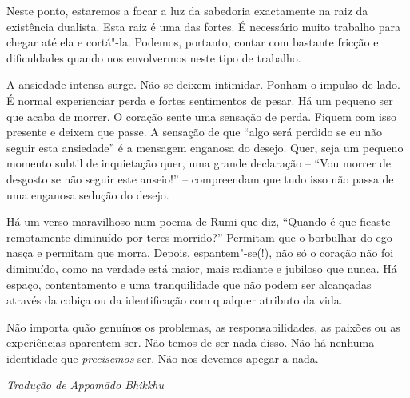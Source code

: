 Neste ponto, estaremos a focar a luz da sabedoria exactamente na raiz da
existência dualista. Esta raiz é uma das fortes. É necessário muito
trabalho para chegar até ela e cortá"-la. Podemos, portanto, contar com
bastante fricção e dificuldades quando nos envolvermos neste tipo de
trabalho.

A ansiedade intensa surge. Não se deixem intimidar. Ponham o impulso de
lado. É normal experienciar perda e fortes sentimentos de pesar. Há um
pequeno ser que acaba de morrer. O coração sente uma sensação de perda.
Fiquem com isso presente e deixem que passe. A sensação de que ``algo
será perdido se eu não seguir esta ansiedade'' é a mensagem enganosa do
desejo. Quer, seja um pequeno momento subtil de inquietação quer, uma
grande declaração -- ``Vou morrer de desgosto se não seguir este
anseio!'' -- compreendam que tudo isso não passa de uma enganosa sedução
do desejo.

Há um verso maravilhoso num poema de Rumi que diz, ``Quando é que
ficaste remotamente diminuído por teres morrido?'' Permitam que o
borbulhar do ego nasça e permitam que morra. Depois, espantem"-se(!), não
só o coração não foi diminuído, como na verdade está maior, mais
radiante e jubiloso que nunca. Há espaço, contentamento e uma
tranquilidade que não podem ser alcançadas através da cobiça ou da
identificação com qualquer atributo da vida.

Não importa quão genuínos os problemas, as responsabilidades, as paixões
ou as experiências aparentem ser. Não temos de ser nada disso. Não há
nenhuma identidade que \emph{precisemos} ser. Não nos devemos apegar a
nada.

\bigskip

{\raggedleft\itshape
  Tradução de Appamādo Bhikkhu
\par}
